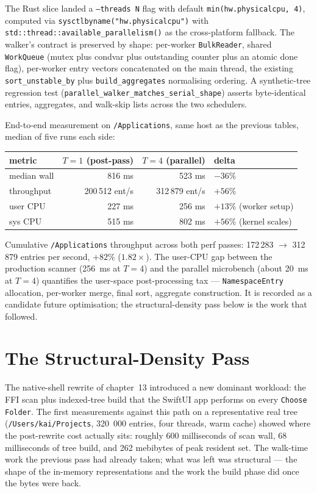 The Rust slice landed a \texttt{--threads N} flag with default
\texttt{min(hw.physicalcpu, 4)}, computed via
\texttt{sysctlbyname("hw.physicalcpu")} with
\texttt{std::thread::available\_parallelism()} as the
cross-platform fallback. The walker's contract is preserved by
shape: per-worker \texttt{BulkReader}, shared
\texttt{WorkQueue} (mutex plus condvar plus outstanding counter
plus an atomic done flag), per-worker entry vectors concatenated
on the main thread, the existing
\texttt{sort\_unstable\_by} plus \texttt{build\_aggregates}
normalising ordering. A synthetic-tree regression test
(\texttt{parallel\_walker\_matches\_serial\_shape}) asserts
byte-identical entries, aggregates, and walk-skip lists across
the two schedulers.

End-to-end measurement on \texttt{/Applications}, same host as
the previous tables, median of five runs each side:

\begin{center}
\begin{tabular}{lrrl}
\toprule
metric             & $T = 1$ (post-pass) & $T = 4$ (parallel) & delta \\
\midrule
median wall        & 816 ms       & 523 ms       & $-36\%$ \\
throughput         & 200\,512 ent/s & 312\,879 ent/s & $+56\%$ \\
user CPU           & 227 ms       & 256 ms       & $+13\%$ (worker setup) \\
sys CPU            & 515 ms       & 802 ms       & $+56\%$ (kernel scales) \\
\bottomrule
\end{tabular}
\end{center}

Cumulative \texttt{/Applications} throughput across both perf
passes: 172\,283 $\to$ 312\,879 entries per second, $+82\%$
($1.82\times$). The user-CPU gap between the production scanner
(256~ms at $T = 4$) and the parallel microbench (about 20~ms at
$T = 4$) quantifies the user-space post-processing tax ---
\texttt{NamespaceEntry} allocation, per-worker merge, final sort,
aggregate construction. It is recorded as a candidate future
optimisation; the structural-density pass below is the work that
followed.

\section{The Structural-Density Pass}

The native-shell rewrite of chapter~13 introduced a new dominant
workload: the FFI scan plus indexed-tree build that the SwiftUI
app performs on every \texttt{Choose Folder}. The first
measurements against this path on a representative real tree
(\texttt{/Users/kai/Projects}, 320~000 entries, four threads,
warm cache) showed where the post-rewrite cost actually sits:
roughly 600 milliseconds of scan wall, 68 milliseconds of tree
build, and 262 mebibytes of peak resident set. The walk-time
work the previous pass had already taken; what was left was
structural --- the shape of the in-memory representations and the
work the build phase did once the bytes were back.

